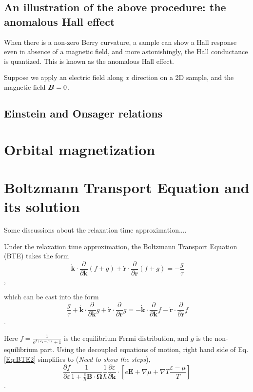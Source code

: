\documentclass{revtex4-2}
\newcommand{\bvec}[1]{{\mathbf #1}}
\renewcommand\vec[1]{\ensuremath\boldsymbol{#1}} %
\begin{document}
\subsection{An illustration of the above procedure: the anomalous Hall effect}
When there is a non-zero Berry curvature, a sample can show a Hall response even in absence of a magnetic field, and more astonishingly, the Hall conductance is quantized. This is known as the anomalous Hall effect.

Suppose we apply an electric field along $x$ direction on a 2D sample, and the magnetic field $\vec{B} = 0$.

\subsection{Einstein and Onsager relations}
\section{Orbital magnetization}
\section{Boltzmann Transport Equation and its solution}\label{sec:BTE-and-solution}
\cite{book:ZimanSolidState}

Some discussions about the relaxation time approximation....

Under the relaxation time approximation, the Boltzmann Transport Equation (BTE) takes the form
\begin{equation}~\label{Eq:BTE}
\dot{\bvec{k}}\cdot\frac{\partial}{\partial \bvec{k}} (f + g) + \dot{\bvec{r}}\cdot\frac{\partial}{\partial \bvec{r}} (f + g) = -\frac{g}{\tau}
\end{equation},

which can be cast into the form
\begin{equation}~\label{Eq:BTE2}
	\frac{g}{\tau} + \dot{\bvec{k}}\cdot\frac{\partial}{\partial \bvec{k}} g + \dot{\bvec{r}}\cdot\frac{\partial}{\partial \bvec{r}} g = -\dot{\bvec{k}}\cdot\frac{\partial}{\partial \bvec{k}}f - \dot{\bvec{r}}\cdot\frac{\partial}{\partial \bvec{r}}f
\end{equation}.

Here $f = \frac{1}{e^{\beta(\varepsilon_{\bvec{k}} - \mu)} + 1}$ is the equilibrium Fermi distribution, and $g$ is the non-equilibrium part.
Using the decoupled equations of motion, right hand side of Eq. \eqref{Eq:BTE2} simplifies to (\textit{Need to show the steps}),
$$\frac{\partial f}{\partial \varepsilon}\frac{1}{1 + \frac{e}{\hbar} \bvec{B}\cdot\bvec{\Omega}}
\frac{1}{\hbar} \frac{\partial \varepsilon}{\partial \bvec{k}}\cdot\left[e \bvec{E} + \nabla{\mu} + \nabla T \frac{\varepsilon - \mu}{T}\right]
$$.
\end{document}
